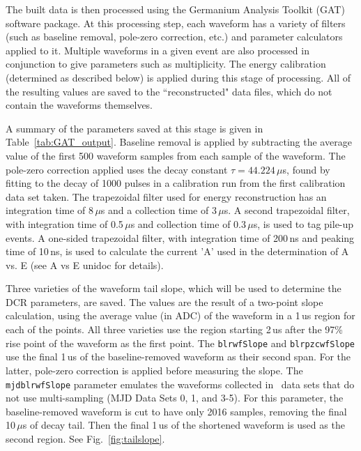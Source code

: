 \documentclass[groupedaddress,rmp,amsmath,amssymb,bibnotes,altaffilletter,twocolumn]{revtex4-1}
\begin{document}
The built data is then processed using the Germanium Analysis Toolkit (GAT) software package. At this processing step, each waveform has a variety of filters (such as baseline removal, pole-zero correction, etc.) and parameter calculators applied to it. Multiple waveforms in a given event are also processed in conjunction to give parameters such as multiplicity. The energy calibration (determined as described below) is applied during this stage of processing. All of the resulting values are saved to the ``reconstructed" data files, which do not contain the waveforms themselves. 

A summary of the parameters saved at this stage is given in Table~\ref{tab:GAT_output}. Baseline removal is applied by subtracting the average value of the first 500 waveform samples from each sample of the waveform. The pole-zero correction applied uses the decay constant $\tau = 44.224\,\mu$s, found by fitting to the decay of 1000 pulses in a calibration run from the first calibration data set taken. The trapezoidal filter used for energy reconstruction has an integration time of 8\,$\mu$s and a collection time of 3\,$\mu$s. A second trapezoidal filter, with integration time of 0.5\,$\mu$s and collection time of 0.3\,$\mu$s, is used to tag pile-up events. A one-sided trapezoidal filter, with integration time of 200\,ns and peaking time of 10\,ns, is used to calculate the current 'A' used in the determination of A vs. E (see A vs E unidoc for details). 

Three varieties of the waveform tail slope, which will be used to determine the DCR parameters, are saved. The values are the result of a two-point slope calculation, using the average value (in ADC) of the waveform in a 1\,us region for each of the points. All three varieties use the region starting 2\,us after the 97\% rise point of the waveform as the first point. The {\tt blrwfSlope} and {\tt blrpzcwfSlope} use the final 1\,us of the baseline-removed waveform as their second span. For the latter, pole-zero correction is applied before measuring the slope. The {\tt mjdblrwfSlope} parameter emulates the waveforms collected in \MJ\ data sets that do not use multi-sampling (MJD Data Sets 0, 1, and 3-5). For this parameter, the baseline-removed waveform is cut to have only 2016 samples, removing the final 10\,$\mu$s of decay tail. Then the final 1\,us of the shortened waveform is used as the second region. See Fig.~\ref{fig:tailslope}.
\end{document}
